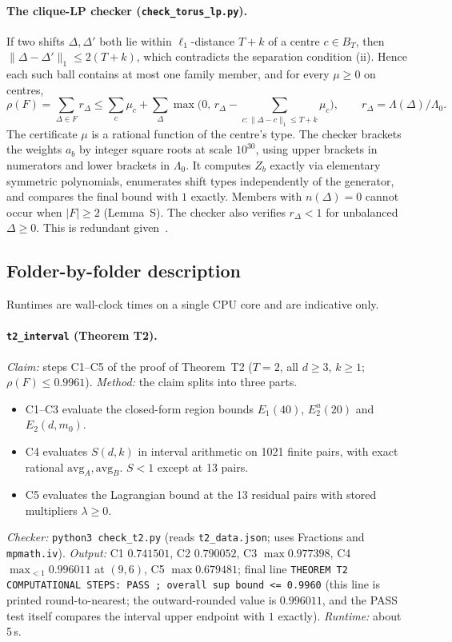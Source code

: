 \documentclass[11pt]{article}
\theoremstyle{definition}
\theoremstyle{remark}
\begin{document}
\paragraph{The clique-LP checker (\texttt{check\_torus\_lp.py}).}
If two shifts $\Delta,\Delta'$ both lie within $\ell_1$-distance $T+k$ of a centre $c\in B_T$, then $\lVert\Delta-\Delta'\rVert_1\le2(T+k)$, which contradicts the separation condition (ii). Hence each such ball contains at most one family member, and for every $\mu\ge0$ on centres,
\[
\rho(F)=\sum_{\Delta\in F}r_\Delta\le\sum_c\mu_c+\sum_\Delta\max\Big(0,\,r_\Delta-\sum_{c:\lVert\Delta-c\rVert_1\le T+k}\mu_c\Big),
\qquad r_\Delta=\Lambda(\Delta)/\Lambda_0 .
\]
The certificate $\mu$ is a rational function of the centre's type.
The checker brackets the weights $a_b$ by integer square roots at scale $10^{30}$, using upper brackets in numerators and lower brackets in $\Lambda_0$.
It computes $Z_b$ exactly via elementary symmetric polynomials, enumerates shift types independently of the generator, and compares the final bound with $1$ exactly.
Members with $n(\Delta)=0$ cannot occur when $|F|\ge2$ (Lemma~S).
The checker also verifies $r_\Delta<1$ for unbalanced $\Delta\ge0$. This is redundant given~\cite[Prop.~X.5, Eq.~(148)]{Herasymenko2026}.

\subsection*{Folder-by-folder description}
Runtimes are wall-clock times on a single CPU core and are indicative only.

\paragraph{\texttt{t2\_interval} (Theorem T2).}
\emph{Claim:} steps C1--C5 of the proof of Theorem~T2 ($T=2$, all $d\ge3$, $k\ge1$; $\rho(F)\le0.9961$).
\emph{Method:} the claim splits into three parts.
\begin{itemize}
\item C1--C3 evaluate the closed-form region bounds $E_1(40)$, $E_2^u(20)$ and $E_2(d,m_0)$.
\item C4 evaluates $S(d,k)$ in interval arithmetic on 1021 finite pairs, with exact rational $\mathrm{avg}_A,\mathrm{avg}_B$. $S<1$ except at 13 pairs.
\item C5 evaluates the Lagrangian bound at the 13 residual pairs with stored multipliers $\lambda\ge0$.
\end{itemize}
\emph{Checker:} \texttt{python3 check\_t2.py} (reads \texttt{t2\_data.json}; uses Fractions and \texttt{mpmath.iv}).
\emph{Output:} C1 $0.741501$, C2 $0.790052$, C3 $\max 0.977398$, C4 $\max_{<1}0.996011$ at $(9,6)$, C5 $\max 0.679481$; final line \texttt{THEOREM T2 COMPUTATIONAL STEPS: PASS ; overall sup bound <= 0.9960} (this line is printed round-to-nearest; the
outward-rounded value is $0.996011$, and the PASS test itself compares the interval upper endpoint with $1$ exactly).
\emph{Runtime:} about 5\,s.
\end{document}
